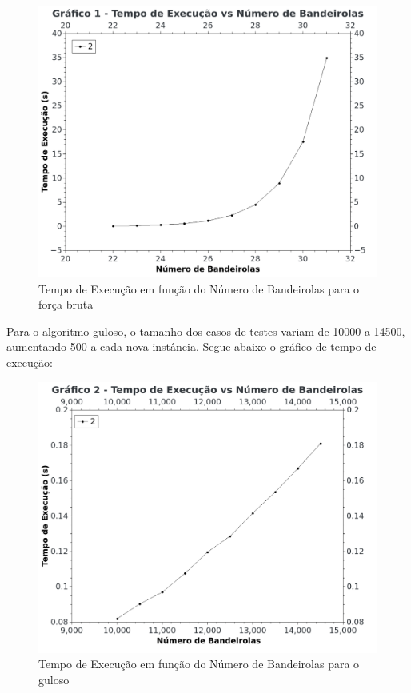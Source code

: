 \documentclass[
	12pt,
	a4paper,
	onepage,
	brazil
]{article}
\begin{document}
	\begin{figure}[H]
		\centering
		\includegraphics[scale=2]{brute_force_graph.png}
		\caption{Tempo de Execução em função do Número de Bandeirolas para o força bruta}
	\end{figure}

	Para o algoritmo guloso, o tamanho dos casos de testes variam de 10000 a 14500, aumentando 500 a cada nova instância. Segue abaixo o gráfico de tempo de execução:
	
	\begin{figure}[H]
		\centering
		\includegraphics[scale=2]{greedy_graph.png}
		\caption{Tempo de Execução em função do Número de Bandeirolas para o guloso}
	\end{figure}
\end{document}

